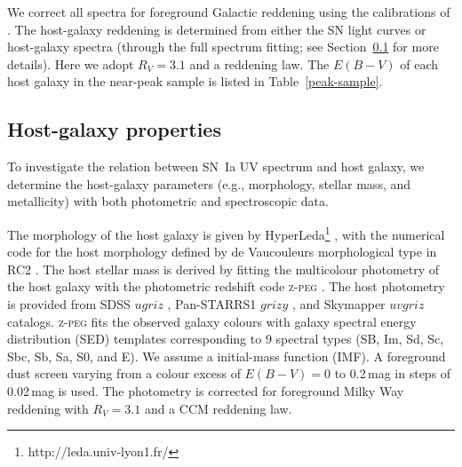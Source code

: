 \documentclass[useAMS,usenatbib]{mn2e}
\newcommand{\ugriz}{\protect\hbox{$ugriz$} }
\newcommand{\grizy}{\protect\hbox{$grizy$} }
\newcommand{\uvgriz}{\protect\hbox{$uvgriz$} }
\begin{document}
We correct all spectra for foreground Galactic reddening using the calibrations of \citet{2011ApJ...737..103S}. The host-galaxy reddening is determined from either the SN light curves \citep[i.e., given by light-curve fitters;][]{2012ApJ...744...38F,2012ApJ...753L...5F,2014MNRAS.443.2887F,2013ApJ...769L...1F,2013A&A...554A..27P,2015MNRAS.452.4307P,2015ApJS..221...22I,2016ApJ...826..144S} or host-galaxy spectra (through the full spectrum fitting; see Section~\ref{sec:host} for more details). Here we adopt $R_{V}=3.1$ and a \citet*[][CCM]{1989ApJ...345..245C} reddening law. The $E(B-V)$ of each host galaxy in the near-peak sample is listed in Table~\ref{peak-sample}.

\subsection{Host-galaxy properties}
\label{sec:host}
To investigate the relation between SN~Ia UV spectrum and host galaxy, we determine the host-galaxy parameters (e.g., morphology, stellar mass, and metallicity) with both photometric and spectroscopic data. 

The morphology of the host galaxy is given by HyperLeda\footnote{http://leda.univ-lyon1.fr/} \citep{2014A&A...570A..13M}, with the numerical code for the host morphology defined by de Vaucouleurs morphological type in RC2 \citep{1976RC2...C......0D}. The host stellar mass is derived by fitting the multicolour photometry of the host galaxy with the photometric redshift code \textsc{z-peg} \citep{2002A&A...386..446L}. The host photometry is provided from SDSS \ugriz \citep{2018ApJS..235...42A}, Pan-STARRS1 \grizy \citep{2016arXiv161205560C}, and Skymapper \uvgriz \citep{2018PASA...35...10W} catalogs. \textsc{z-peg} fits the observed galaxy colours with galaxy spectral energy distribution (SED) templates corresponding to 9 spectral types (SB, Im, Sd, Sc, Sbc, Sb, Sa, S0, and E). We assume a \citet{1955ApJ...121..161S} initial-mass function (IMF).  A foreground dust screen varying from a colour excess of $E(B-V)=0$ to 0.2\,mag in steps of 0.02\,mag is used. The photometry is corrected for foreground Milky Way reddening with $R_{V} = 3.1$ and a CCM reddening law.
\end{document}
